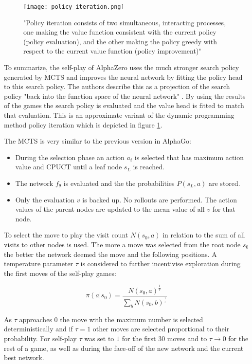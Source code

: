 \begin{figure}
    \centering
    \texttt{[image: policy\_iteration.png]}
    \caption{"Policy iteration consists of two simultaneous, interacting processes, one making the value function consistent with the current policy (policy evaluation), and the other making the policy greedy with respect to the current value function (policy improvement)" \cite[86]{sutton_reinforcement_2018}}
    \label{policy_iteration}
\end{figure}

To summarize, the self-play of AlphaZero uses the much stronger search policy generated by MCTS and improves the neural network by fitting the policy head to this search policy. The authors describe this as a projection of the search policy "back into the function space of the neural network" \cite[p. 19]{silver_mastering_2017}. By using the results of the games the search policy is evaluated and the value head is fitted to match that evaluation. This is an approximate variant of the dynamic programming method policy iteration which is depicted in figure \ref{policy_iteration}.

The MCTS is very similar to the previous version in AlphaGo:
\begin{itemize}
    \item During the selection phase an action $a_t$ is selected that has maximum action value and CPUCT until a leaf node $s_L$ is reached.
    \item The network $f_{\theta}$ is evaluated and the the probabilities $P(s_L, a)$ are stored.
    \item Only the evaluation $v$ is backed up. No rollouts are performed. The action values of the parent nodes are updated to the mean value of all $v$ for that node.
\end{itemize}

To select the move to play the visit count $N(s_0, a)$ in relation to the sum of all visits to other nodes is used. The more a move was selected from the root node $s_0$ the better the network deemed the move and the following positions. A temperature parameter $\tau$ is considered to further incentivise exploration during the first moves of the self-play games:

\begin{equation}
    \pi(a|s_0) = \frac{N(s_0, a)^{\frac{1}{\tau}}}{\sum_b N(s_0, b)^{\frac{1}{\tau}}}
\end{equation}

As $\tau$ approaches $0$ the move with the maximum number is selected deterministically and if $\tau = 1$ other moves are selected proportional to their probability. For self-play $\tau$ was set to $1$ for the first 30 moves and to $\tau \rightarrow 0$ for the rest of a game, as well as during the face-off of the new network and the current best network.

